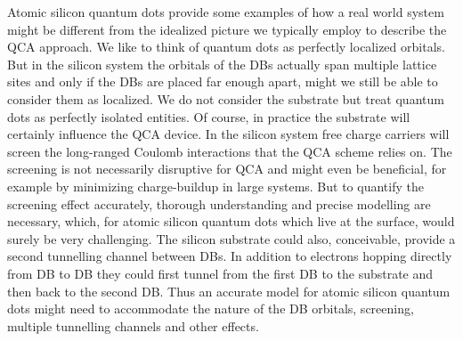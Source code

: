 Atomic silicon quantum dots provide some examples of how a real world system
might be different from the idealized picture we typically employ to describe
the QCA approach. We like to think of quantum dots as perfectly localized
orbitals. But in the silicon system the orbitals of the DBs actually span
multiple lattice sites and only if the DBs are placed far enough apart, might we
still be able to consider them as localized. We do not consider the substrate
but treat quantum dots as perfectly isolated entities. Of course, in practice
the substrate will certainly influence the QCA device. In the silicon system
free charge carriers will screen the long-ranged Coulomb interactions that the
QCA scheme relies on. The screening is not necessarily disruptive for QCA and
might even be beneficial, for example by minimizing charge-buildup in large
systems. But to quantify the screening effect accurately, thorough understanding
and precise modelling are necessary, which, for atomic silicon quantum dots
which live at the surface, would surely be very challenging. The silicon
substrate could also, conceivable, provide a second tunnelling channel between
DBs. In addition to electrons hopping directly from DB to DB they could first
tunnel from the first DB to the substrate and then back to the second DB. Thus
an accurate model for atomic silicon quantum dots might need to accommodate the
nature of the DB orbitals, screening, multiple tunnelling channels and other
effects.


